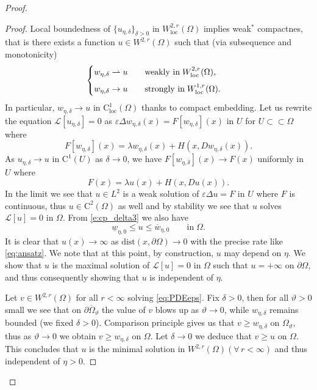 \documentclass[11pt,reqno]{amsart}
\numberwithin{figure}{section}
\theoremstyle{plain}
\theoremstyle{remark}
\numberwithin{equation}{section}
\newcommand{\rup}{\rightharpoonup}
\begin{document}
\begin{proof}
\begin{proof}
    \noindent Local boundedness of $\{u_{\eta,\delta}\}_{\delta>0}$ in $W^{2,r}_{\mathrm{loc}}(\Omega)$ implies weak$^*$ compactnes, that is there exists a function $u\in W^{2,r}(\Omega)$ such that (via subsequence and monotonicity)
    \begin{equation*}
    \begin{cases}
        w_{\eta,\delta} \rup u \qquad\text{weakly in}\;W^{2,r}_{\mathrm{loc}}(\Omega),\vspace{0.2cm}\\
        w_{\eta,\delta} \to u \qquad\text{strongly in}\;W^{1,r}_{\mathrm{loc}}(\Omega).
    \end{cases}
    \end{equation*}
    In particular, $w_{\eta,\delta}\to u$ in $\mathrm{C}^1_{\mathrm{loc}}(\Omega)$ thanks to compact embedding. Let us rewrite the equation $\mathcal{L}\left[u_{\eta,\delta}\right] = 0$ as $\varepsilon\Delta w_{\eta,\delta}(x) = F[w_{\eta,\delta}](x)$ in $U$ for $U\subset\subset \Omega$ where
    \begin{equation*}
        F[w_{\eta,\delta}](x) =  \lambda w_{\eta,\delta}(x) + H(x,Dw_{\eta,\delta}(x)).
    \end{equation*}
    As $u_{\eta,\delta}\to u$ in $\mathrm{C}^1(U)$ as $\delta\to 0$, we have $F[w_{\eta,\delta}](x) \to F(x)$ uniformly in $U$ where 
    \begin{equation*}
        F(x) = \lambda u(x) + H(x,Du(x)).
    \end{equation*}
    In the limit we see that $u\in L^2$ is a weak solution of $\varepsilon\Delta u = F$ in $U$ where $F$ is continuous, thus $u\in \mathrm{C}^2(\Omega)$ as well and by stability we see that $u$ solves $\mathcal{L}[u] = 0$ in $\Omega$. From \eqref{e:cp_delta3} we also have
    \begin{equation*}
        \underline{w}_{\eta,0} \leq u \leq \overline{w}_{\eta,0} \qquad\text{in}\;\Omega.
    \end{equation*}
    It is clear that $u(x)\to \infty$ as $\mathrm{dist}(x,\partial\Omega)\to 0$ with the precise rate like \eqref{eq:ansatz}. We note that at this point, by construction, $u$ may depend on $\eta$. We show that $u$ is the maximal solution of $\mathcal{L}[u] = 0$ in $\Omega$ such that $u = +\infty$ on $\partial\Omega$, and thus consequently showing that $u$ is independent of $\eta$.
    
    \noindent Let $v\in W^{2,r}(\Omega)$ for all $r<\infty$ solving \eqref{eq:PDEeps}. Fix $\delta>0$, then for all $\vartheta>0$ small we see that on $\partial\overline{\Omega}_\vartheta$ the value of $v$ blows up as $\vartheta\to 0$, while $w_{\eta,\delta}$ remains bounded (we fixed $\delta>0$). Comparison principle gives us that $v\geq w_{\eta,\delta}$ on $\Omega_{\vartheta}$, thus as $\vartheta\to 0$ we obtain $v\geq w_{\eta,\delta}$ on $\Omega$. Let $\delta\to 0$ we deduce that $v\geq u$ on $\Omega$. This concludes that $u$ is the minimal solution in $W^{2,r}(\Omega)(\forall\,r<\infty)$ and thus independent of $\eta>0$. 
\end{proof}




\end{proof}
\end{document}
